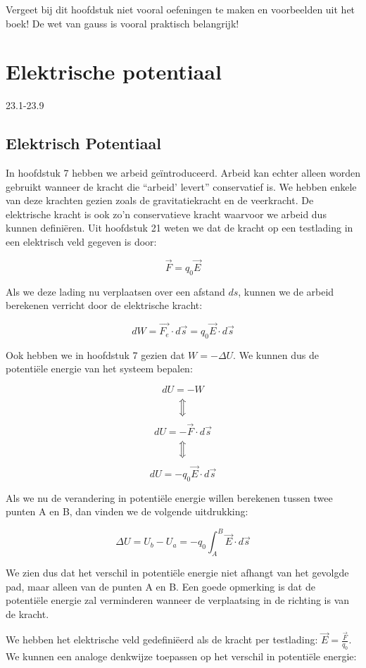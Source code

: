 \documentclass[12pt,a4paper]{article}
\newcommand{\Luda}{\Big\Updownarrow}
\begin{document}
    Vergeet bij dit hoofdstuk niet vooral oefeningen te maken en voorbeelden uit het boek! De wet van gauss is vooral praktisch belangrijk!
    \section{Elektrische potentiaal}
    23.1-23.9

    \subsection{Elektrisch Potentiaal}
    In hoofdstuk 7 hebben we arbeid geïntroduceerd. Arbeid kan echter alleen worden gebruikt wanneer
    de kracht die ``arbeid' levert'' conservatief is. We hebben enkele van deze krachten gezien zoals de
    gravitatiekracht en de veerkracht. De elektrische kracht is ook zo'n conservatieve kracht waarvoor
    we arbeid dus kunnen definiëren. Uit hoofdstuk 21 weten we dat de kracht op een testlading in een
    elektrisch veld gegeven is door: 
    
    $$\vec{F} = q_{0} \vec{E}$$
    
    Als we deze lading nu verplaatsen over een afstand $ds$, kunnen we de arbeid berekenen verricht 
    door de elektrische kracht:
    
    $$dW = \vec{F_{e}} \cdot d\vec{s} = q_{0}\vec{E} \cdot d\vec{s}$$
    
    Ook hebben we in hoofdstuk 7 gezien dat $W = -\Delta U$. We kunnen dus de potentiële energie van
    het systeem bepalen:
    
    $$dU = -W$$
    $$\Luda$$
    $$dU = -\vec{F} \cdot d\vec{s}$$
    $$\Luda$$
    $$dU = -q_{0}\vec{E} \cdot d\vec{s}$$
    
    Als we nu de verandering in potentiële energie willen berekenen tussen twee punten A en B, dan vinden 
    we de volgende uitdrukking:
    
    $$\Delta U = U_{b} - U_{a} = -q_{0} \int_{A}^{B} \vec{E} \cdot d\vec{s}$$
    
    We zien dus dat het verschil in potentiële energie niet afhangt van het gevolgde pad, maar alleen van 
    de punten A en B. Een goede opmerking is dat de potentiële energie zal verminderen wanneer de verplaatsing
    in de richting is van de kracht.
    
    We hebben het elektrische veld gedefiniëerd als de kracht per testlading: $\vec{E} = \frac{\vec{F}}{q_{0}}$. 
    We kunnen een analoge denkwijze toepassen op het verschil in potentiële energie:
    
\end{document}
